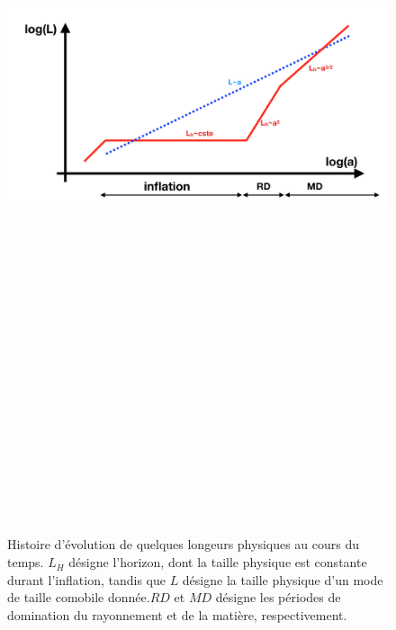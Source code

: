 \begin{figure}[htbp]
	\centering
		\includegraphics[height=25cm]{figs/inflation.png}
	\caption{Histoire d'évolution de quelques longeurs physiques au cours du temps. $L_H$ désigne l'horizon, dont la taille physique est constante durant l'inflation, tandis que $L$ désigne la taille physique d'un mode de taille comobile donnée.$RD$ et $MD$ désigne les périodes de domination du rayonnement et de la matière, respectivement. }
	\label{f:inflation}
\end{figure}

